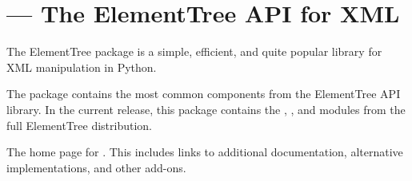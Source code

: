 \section{ ---
         The ElementTree API for XML}



The ElementTree package is a simple, efficient, and quite popular
library for XML manipulation in Python.

The  package contains the most common components
from the ElementTree API library.
In the current release, this package contains the ,
, and  modules from the full
ElementTree distribution.


\begin{seealso}
        {The home page for .  This includes links
         to additional documentation, alternative implementations, and
         other add-ons.}
\end{seealso}
